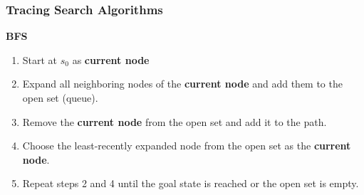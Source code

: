 \begin{example}
    
\end{example}
\newpage

\subsubsection{Tracing Search Algorithms}
\begin{example}
\end{example}
\newpage

\begin{process} \textbf{BFS}
    \begin{enumerate}
        \item Start at $s_0$ as \textbf{current node}
        \item Expand all neighboring nodes of the \textbf{current node} and add them to the open set (queue).
        \item Remove the \textbf{current node} from the open set and add it to the path. 
        \item Choose the least-recently expanded node from the open set as the \textbf{current node}.
        \item Repeat steps 2 and 4 until the goal state is reached or the open set is empty.
    \end{enumerate}
\end{process}

